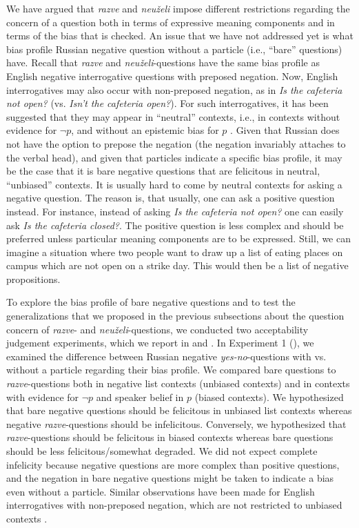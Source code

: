 \documentclass[output=paper,colorlinks,citecolor=brown]{langscibook}
\begin{document}
We have argued that \textit{razve} and \textit{neuželi} impose different restrictions regarding the concern of a question both in terms of expressive meaning components and in terms of the bias that is checked. An issue that we have not addressed yet is what bias profile Russian negative question without a particle (i.e., ``bare'' questions) have. Recall that \textit{razve} and \textit{neuželi}-questions have the same bias profile as English negative interrogative questions with preposed negation. Now, English interrogatives may also occur with non-preposed negation, as in \textit{Is the cafeteria not open?} (vs. \textit{Isn't the cafeteria open?}). For such interrogatives, it has been suggested that they may appear in ``neutral'' contexts, i.e., in contexts without evidence for $\neg p$, and without an epistemic bias for $p$ \citep{romerohan2004negative}. Given that Russian does not have the option to prepose the negation (the negation invariably attaches to the verbal head), and given that particles indicate a specific bias profile, it may be the case that it is bare negative questions that are felicitous in neutral, ``unbiased'' contexts. It is usually hard to come by neutral contexts for asking a negative question. The reason is, that usually, one can ask a positive question instead. For instance, instead of asking \textit{Is the cafeteria not open?} one can easily ask \textit{Is the cafeteria closed?}. The positive question is less complex and should be preferred unless particular meaning components are to be expressed. Still, we can imagine a situation where two people want to draw up a list of eating places on campus which are not open on a strike day. This would then be a list of negative propositions.

To explore the bias profile of bare negative questions and to test the generalizations that we proposed in the previous subsections about the question concern of \textit{razve}- and \textit{neuželi}-questions, we conducted two acceptability judgement experiments, which we report in  and . In Experiment 1 (), we examined the difference between Russian negative \textit{yes-no}-questions with vs. without a particle regarding their bias profile. We compared bare questions to \textit{razve}-questions both in negative list contexts (unbiased contexts) and in contexts with evidence for $\neg p$ and speaker belief in $p$ (biased contexts). We hypothesized that bare negative questions should be felicitous in unbiased list contexts whereas negative \textit{razve}-questions should be infelicitous. Conversely, we hypothesized that \textit{razve}-questions should be felicitous in biased contexts whereas bare questions should be less felicitous/somewhat degraded. We did not expect complete infelicity because negative questions are more complex than positive questions, and the negation in bare negative questions might be taken to indicate a bias even without a particle. Similar observations have been made for English interrogatives with non-preposed negation, which are not restricted to unbiased contexts \citep{romerohan2004negative}.
\end{document}
